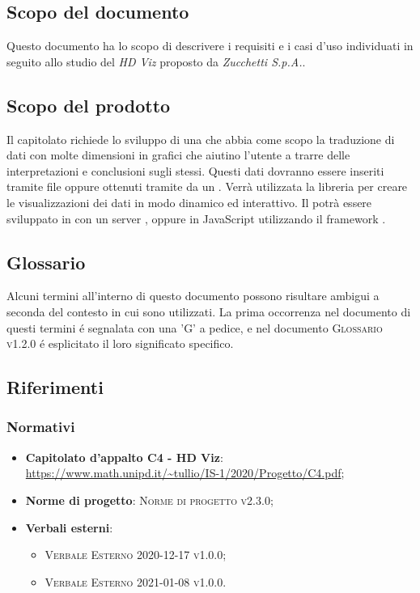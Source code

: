 \documentclass[../analisi_dei_requisiti.tex]{subfiles}
\begin{document}
\subsection{Scopo del documento}%
\label{sub:scopo_del_documento}
Questo documento ha lo scopo di descrivere i requisiti e i casi d'uso individuati in seguito allo studio del  \emph{HD Viz} proposto da \emph{Zucchetti S.p.A.}.

\subsection{Scopo del prodotto}%
\label{sub:scopo_del_prodotto}
Il capitolato richiede lo sviluppo di una  che abbia come scopo la
traduzione di dati con molte dimensioni in grafici che aiutino l’utente a trarre delle interpretazioni e conclusioni sugli stessi.
Questi dati dovranno essere inseriti tramite file  oppure ottenuti tramite  da un .
Verrà utilizzata la libreria   per creare le visualizzazioni dei dati in modo dinamico ed interattivo.
Il  potrà essere sviluppato in  con un server ,  oppure
in JavaScript utilizzando il framework .


\subsection{Glossario}
\label{sub:glossario}
Alcuni termini all'interno di questo documento possono risultare ambigui a seconda del contesto in cui sono utilizzati.
La prima occorrenza nel documento di questi termini é segnalata con una 'G' a pedice, e nel documento
\textsc{Glossario v1.2.0} é esplicitato il loro significato specifico.


\subsection{Riferimenti}
\label{sub:riferimenti}

\subsubsection{Normativi}%
\label{ssub:normativi}


\begin{itemize}
  \item \textbf{Capitolato d'appalto C4 - HD Viz}: \\
        \url{https://www.math.unipd.it/~tullio/IS-1/2020/Progetto/C4.pdf};
  \item \textbf{Norme di progetto}: \textsc{Norme di progetto v2.3.0};
  \item \textbf{Verbali esterni}:
        \begin{itemize}
          \item \textsc{Verbale Esterno 2020-12-17 v1.0.0};
          \item \textsc{Verbale Esterno 2021-01-08 v1.0.0}.
        \end{itemize}
\end{itemize}
\end{document}
